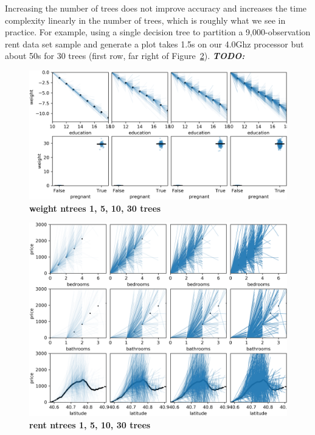 \documentclass[12pt]{article}
\newcommand{\figref}[1]{Figure~\ref{#1}}
\newcommand{\todo}[1]{{\bf\em TODO:} {{\color{red}{#1}}}}
\begin{document}
Increasing the number of trees does not improve accuracy and increases the time complexity linearly in the number of trees, which is roughly what we see in practice.  For example, using a single decision tree to partition a 9,000-observation rent data set sample and generate a plot takes 1.5s on our 4.0Ghz processor but about 50s for 30 trees (first row, far right of \figref{fig:rent_ntrees}). \todo{seems less accuarate with bootstrap}

\begin{figure}[htbp]
\begin{center}
\includegraphics[scale=0.5]{images/height_pregnant_vs_weight_ntrees.png}
\caption{{\bf  weight ntrees 1, 5, 10, 30 trees}}
\label{fig:weight_ntrees}
\end{center}
\end{figure}

\begin{figure}[htbp]
\begin{center}
\includegraphics[scale=0.5]{images/rent_ntrees.png}
\caption{{\bf  rent ntrees 1, 5, 10, 30 trees}}
\label{fig:rent_ntrees}
\end{center}
\end{figure}
\end{document}
